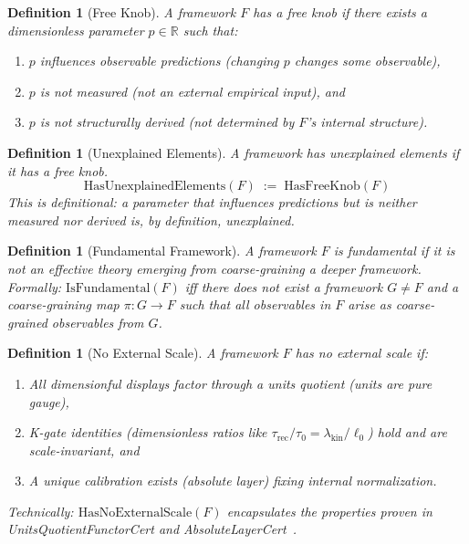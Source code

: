 \documentclass[12pt]{article}
\newtheorem{definition}[theorem]{Definition}
\theoremstyle{remark}
\begin{document}
\begin{definition}[Free Knob]\label{def:free-knob}
A framework $F$ has a \emph{free knob} if there exists a dimensionless parameter $p \in \mathbb{R}$ such that:
\begin{enumerate}
\item[(i)] $p$ influences observable predictions (changing $p$ changes some observable),
\item[(ii)] $p$ is not measured (not an external empirical input), and
\item[(iii)] $p$ is not structurally derived (not determined by $F$'s internal structure).
\end{enumerate}
\end{definition}

\begin{definition}[Unexplained Elements]\label{def:unexplained}
A framework has \emph{unexplained elements} if it has a free knob.
\[
\mathrm{HasUnexplainedElements}(F) \;:=\; \mathrm{HasFreeKnob}(F)
\]
This is definitional: a parameter that influences predictions but is neither measured nor derived is, by definition, unexplained.
\end{definition}

\begin{definition}[Fundamental Framework]\label{def:fundamental}
A framework $F$ is \emph{fundamental} if it is not an effective theory emerging from coarse-graining a deeper framework. Formally: $\mathrm{IsFundamental}(F)$ iff there does not exist a framework $G \neq F$ and a coarse-graining map $\pi: G \to F$ such that all observables in $F$ arise as coarse-grained observables from $G$.
\end{definition}

\begin{definition}[No External Scale]\label{def:no-external-scale}
A framework $F$ has \emph{no external scale} if:
\begin{enumerate}
\item[(i)] All dimensionful displays factor through a units quotient (units are pure gauge),
\item[(ii)] K-gate identities (dimensionless ratios like $\tau_{\mathrm{rec}}/\tau_0 = \lambda_{\mathrm{kin}}/\ell_0$) hold and are scale-invariant, and
\item[(iii)] A unique calibration exists (absolute layer) fixing internal normalization.
\end{enumerate}
Technically: $\mathrm{HasNoExternalScale}(F)$ encapsulates the properties proven in UnitsQuotientFunctorCert and AbsoluteLayerCert~\cite{Washburn2025Exclusivity}.
\end{definition}
\end{document}
